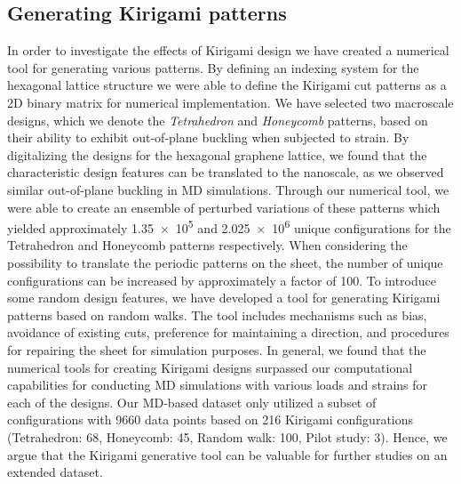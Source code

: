 \subsection{Generating Kirigami patterns}
In order to investigate the effects of Kirigami design we have created a
numerical tool for generating various patterns. By defining an indexing system
for the hexagonal lattice structure we were able to define the Kirigami cut patterns
as a 2D binary matrix for numerical implementation. We have selected two
macroscale designs, which we denote the \textit{Tetrahedron} and
\textit{Honeycomb} patterns, based on their ability to exhibit out-of-plane
buckling when subjected to strain. By digitalizing the designs for the
hexagonal graphene lattice, we found that the characteristic design features can
be translated to the nanoscale, as we observed similar out-of-plane buckling in
\acrshort{MD} simulations. Through our numerical tool, we were able to create an
ensemble of perturbed variations of these patterns which yielded approximately \num{1.35e5}
and \num{2.025e6} unique configurations for the Tetrahedron and Honeycomb
patterns respectively. When considering the possibility to translate the
periodic patterns on the sheet, the number of unique configurations can be increased
by approximately a factor of 100. To introduce some random design features, we
have developed a tool for generating Kirigami patterns based on random walks.
The tool includes mechanisms such as bias, avoidance of existing cuts,
preference for maintaining a direction, and procedures for repairing the sheet
for simulation purposes. In general, we found that the numerical tools for creating Kirigami designs
surpassed our computational capabilities for conducting \acrshort{MD}
simulations with various loads and strains for each of the designs. Our
\acrshort{MD}-based dataset only utilized a subset of configurations with 9660
data points based on 216 Kirigami configurations (Tetrahedron: 68, Honeycomb:
45, Random walk: 100, Pilot study: 3). Hence, we argue that the Kirigami
generative tool can be valuable for further studies on an extended dataset.




